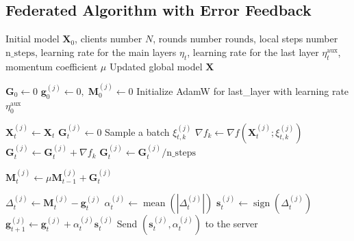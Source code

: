 \documentclass{article}
\begin{document}
\subsection{Federated Algorithm with Error Feedback}\label{app:ef21_alg}
\begin{algorithm}[H]
\caption{Federated EF-USignMuon}
\begin{algorithmic}[1]
\Require Initial model $\mathbf{X}_0$, clients number $N$, rounds number $\mathrm{rounds}$, local steps number $\mathrm{n\_steps}$, learning rate for the main layers $\eta_t$, learning rate for the last layer $\eta_t^{\text{aux}}$,  momentum coefficient $\mu$
\Ensure Updated global model $\mathbf{X}$

\State $\mathbf{G}_0 \gets 0$ 
    \State $\mathbf{g}_0^{(j)} \gets 0, \; \mathbf{M}_0^{(j)} \gets 0$ 
\EndFor
\State Initialize AdamW for last\_layer with learning rate $\eta^{\mathrm{aux}}_0$

     
        \State $\mathbf{X}_t^{(j)} \gets \mathbf{X}_t$ 
        \State $\mathbf{G}_t^{(j)} \gets 0$
            \State Sample a batch $\xi_{t,k}^{(j)}$
            \State $\nabla f_k \gets \nabla f(\mathbf{X}_t^{(j)}; \xi_{t,k}^{(j)})$
            \State $\mathbf{G}_t^{(j)} \gets \mathbf{G}_t^{(j)} + \nabla f_k$
        \EndFor
        \State $\mathbf{G}_t^{(j)} \gets \mathbf{G}_t^{(j)} / \mathrm{n\_steps}$ 
        
        \State $\mathbf{M}_t^{(j)} \gets \mu \mathbf{M}_{t-1}^{(j)} + \mathbf{G}_t^{(j)}$ 
        
            \State $\Delta_t^{(j)} \gets \mathbf{M}_t^{(j)} - \mathbf{g}_t^{(j)}$ 
            \State $\alpha_t^{(j)} \gets \operatorname{mean}(|\Delta_t^{(j)}|)$ 
            \State $\mathbf{s}_t^{(j)} \gets \operatorname{sign}(\Delta_t^{(j)})$ 
            \State $\mathbf{g}_{t+1}^{(j)} \gets \mathbf{g}_t^{(j)} + \alpha_t^{(j)} \mathbf{s}_t^{(j)}$ 
            \State Send $(\mathbf{s}_t^{(j)}, \alpha_t^{(j)})$ to the server
        \EndFor
        

\end{algorithmic}
\end{algorithm}
\end{document}
